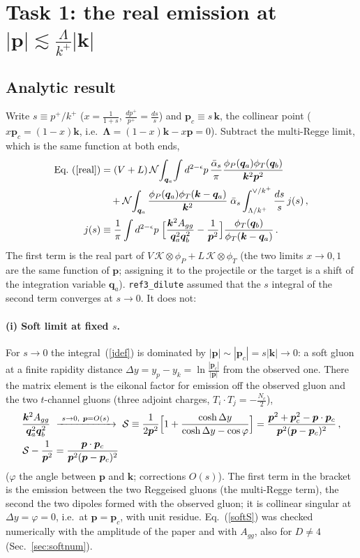 \documentclass[11pt,a4paper]{article}
\renewcommand{\v}[1]{\bm{#1}}
\newcommand{\ab}{\bar\alpha_s}
\begin{document}
\section{Task 1: the real emission at $|\v p|\lesssim\frac{\Lambda}{k^+}|\v k|$}\label{sec:soft}
\subsection{Analytic result}
Write $s\equiv p^+/k^+$ ($x=\frac1{1+s}$, $\frac{dp^+}{p^+}=\frac{ds}{s}$) and $\v p_c\equiv s\,\v k$, the collinear point ($x\v p_c=(1-x)\v k$, i.e.\ $\boldsymbol\Lambda=(1-x)\v k-x\v p=0$). Subtract the multi-Regge limit, which is the same function at both ends,
\begin{align}
\text{Eq.~(\ref{real})}&=(V+L)\,\mathcal N\!\int_{\v q_a}\!\int d^{2-\epsilon}p\,\frac{\ab}{\pi}\frac{\phi_P(\v q_a)\phi_T(\v q_b)}{\v k^2\v p^2}\notag\\
&\quad+\mathcal N\!\int_{\v q_a}\frac{\phi_P(\v q_a)\phi_T(\v k-\v q_a)}{\v k^2}\;\ab\int_{\Lambda/k^+}^{\vee/k^+}\frac{ds}{s}\,j(s)\,,\label{split}\\
j(s)&\equiv\frac1\pi\int d^{2-\epsilon}p\;\Big[\frac{\v k^2A_{gg}}{\v q_a^2\v q_b^2}-\frac{1}{\v p^2}\Big]\frac{\phi_T(\v q_b)}{\phi_T(\v k-\v q_a)}\,.\label{jdef}
\end{align}
The first term is the real part of $V\,\mathcal K\otimes\phi_P+L\,\mathcal K\otimes\phi_T$ (the two limits $x\to0,1$ are the same function of $\v p$; assigning it to the projectile or the target is a shift of the integration variable $\v q_a$). \texttt{ref3\_dilute} assumed that the $s$ integral of the second term converges at $s\to0$. It does not:

\paragraph{(i) Soft limit at fixed $s$.} For $s\to0$ the integral~(\ref{jdef}) is dominated by $|\v p|\sim|\v p_c|=s|\v k|\to0$: a soft gluon at a finite rapidity distance $\Delta y=y_p-y_k=\ln\frac{|\v p_c|}{|\v p|}$ from the observed one. There the matrix element is the eikonal factor for emission off the observed gluon and the two $t$-channel gluons (three adjoint charges, $T_i\cdot T_j=-\frac{N_c}2$),
\begin{align}
\frac{\v k^2A_{gg}}{\v q_a^2\v q_b^2}\ &\xrightarrow{\ s\to0,\ \v p=O(s)\ }\ \mathcal S\equiv\frac{1}{2\v p^2}\Big[1+\frac{\cosh\Delta y}{\cosh\Delta y-\cos\varphi}\Big]=\frac{\v p^2+\v p_c^2-\v p\cdot\v p_c}{\v p^2(\v p-\v p_c)^2}\,,\notag\\
\mathcal S-\frac{1}{\v p^2}&=\frac{\v p\cdot\v p_c}{\v p^2(\v p-\v p_c)^2}\label{softS}
\end{align}
($\varphi$ the angle between $\v p$ and $\v k$; corrections $O(s)$). The first term in the bracket is the emission between the two Reggeised gluons (the multi-Regge term), the second the two dipoles formed with the observed gluon; it is collinear singular at $\Delta y=\varphi=0$, i.e.\ at $\v p=\v p_c$, with unit residue. Eq.~(\ref{softS}) was checked numerically with the amplitude of the paper and with $A_{gg}$, also for $D\neq4$ (Sec.~\ref{sec:softnum}).
\end{document}
